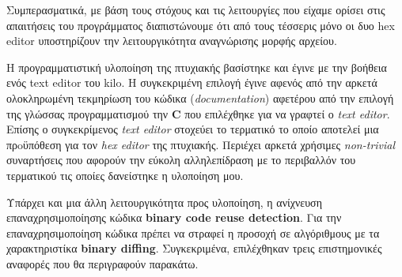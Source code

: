 Συμπερασματικά, με βάση τους στόχους και τις λειτουργίες που είχαμε ορίσει στις απαιτήσεις του προγράμματος διαπιστώνουμε ότι από τους τέσσερις μόνο οι δυο hex editor υποστηρίζουν την λειτουργικότητα αναγνώρισης μορφής αρχείου.

Η προγραμματιστική υλοποίηση της πτυχιακής βασίστηκε και έγινε με την βοήθεια ενός text editor του kilo\cite{kilo}.
H συγκεκριμένη επιλογή έγινε αφενός από την αρκετά ολοκληρωμένη τεκμηρίωση του κώδικα (\emph{documentation}) αφετέρου από την επιλογή της γλώσσας προγραμματισμού την \textbf{C} που επιλέχθηκε για να γραφτεί ο \emph{text editor}.
Επίσης ο συγκεκρίμενος \emph{text editor} στοχεύει το τερματικό το οποίο αποτελεί μια πρoϋπόθεση για τον \emph{hex editor} της πτυχιακής.
Περιέχει αρκετά χρήσιμες \emph{non-trivial} συναρτήσεις που αφορούν την εύκολη αλληλεπίδραση με το περιβαλλόν του τερματικού τις οποίες δανείστηκε η υλοποίηση μου.

Υπάρχει και μια άλλη λειτουργικότητα προς υλοποίηση, η ανίχνευση επαναχρησιμοποίησης κώδικα \textbf{binary code reuse detection}. Για την επαναχρησιμοποίηση κώδικα πρέπει να στραφεί η προσοχή σε αλγόριθμους με τα χαρακτηριστίκα \textbf{binary diffing}. Συγκεκριμένα, επιλέχθηκαν τρεις επιστημονικές αναφορές που θα περιγραφούν παρακάτω. 

\pagebreak

\pagebreak
